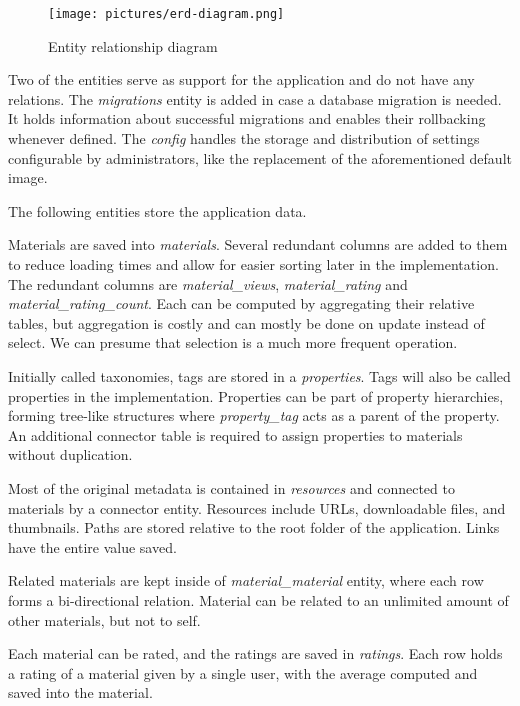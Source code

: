 \documentclass[
  digital,     %
  oneside,     %
  nosansbold,  %
  colorbold, %
  lof,         %
  lot,         %
]{fithesis4}
\begin{document}
\begin{figure}
	\begin{center}
		\begin{minipage}{1\textwidth}
			\texttt{[image: pictures/erd-diagram.png]}
		\end{minipage}
	\end{center}
	\caption{Entity relationship diagram}
	\label{fig:erd}
\end{figure}

Two of the entities serve as support for the application and do not have any relations. The \textit{migrations} entity is added in case a database migration is needed. It holds information about successful migrations and enables their rollbacking whenever defined. The \textit{config} handles the storage and distribution of settings configurable by administrators, like the replacement of the aforementioned default image.

The following entities store the application data.

Materials are saved into \textit{materials}. Several redundant columns are added to them to reduce loading times and allow for easier sorting later in the implementation. The redundant columns are \textit{material\_views}, \textit{material\_rating} and \textit{material\_rating\_count}. Each can be computed by aggregating their relative tables, but aggregation is costly and can mostly be done on update instead of select. We can presume that selection is a much more frequent operation.

Initially called taxonomies, tags are stored in a \textit{properties}. Tags will also be called properties in the implementation. Properties can be part of property hierarchies, forming tree-like structures where \textit{property\_tag} acts as a parent of the property. An additional connector table is required to assign properties to materials without duplication.

Most of the original metadata is contained in \textit{resources} and connected to materials by a connector entity. Resources include URLs, downloadable files, and thumbnails. Paths are stored relative to the root folder of the application. Links have the entire value saved.

Related materials are kept inside of \textit{material\_material} entity, where each row forms a bi-directional relation. Material can be related to an unlimited amount of other materials, but not to self.

Each material can be rated, and the ratings are saved in \textit{ratings}. Each row holds a rating of a material given by a single user, with the average computed and saved into the material.
\end{document}
